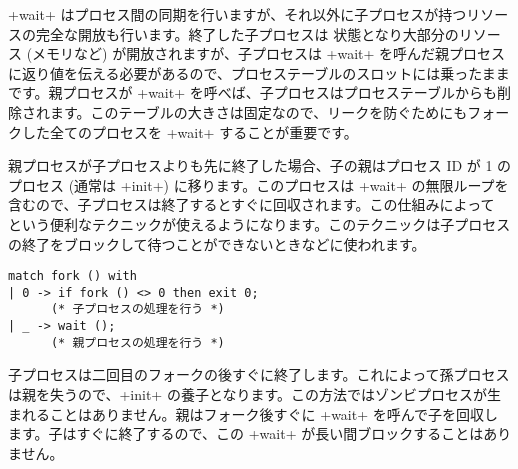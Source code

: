 \ml+wait+ はプロセス間の同期を行いますが、それ以外に子プロセスが持つリソースの完全な開放も行います。終了した子プロセスは  状態となり大部分のリソース (メモリなど) が開放されますが、子プロセスは \ml+wait+ を呼んだ親プロセスに返り値を伝える必要があるので、プロセステーブルのスロットには乗ったままです。親プロセスが \ml+wait+ を呼べば、子プロセスはプロセステーブルからも削除されます。このテーブルの大きさは固定なので、リークを防ぐためにもフォークした全てのプロセスを \ml+wait+ することが重要です。

\label{double-fork}
親プロセスが子プロセスよりも先に終了した場合、子の親はプロセス ID が 1 のプロセス (通常は \ml+init+) に移ります。このプロセスは \ml+wait+ の無限ループを含むので、子プロセスは終了するとすぐに回収されます。この仕組みによって  という便利なテクニックが使えるようになります。このテクニックは子プロセスの終了をブロックして待つことができないときなどに使われます。
%
\begin{lstlisting}
match fork () with
| 0 -> if fork () <> 0 then exit 0;
      (* 子プロセスの処理を行う *)
| _ -> wait ();
      (* 親プロセスの処理を行う *)
\end{lstlisting}
%
子プロセスは二回目のフォークの後すぐに終了します。これによって孫プロセスは親を失うので、\ml+init+ の養子となります。この方法ではゾンビプロセスが生まれることはありません。親はフォーク後すぐに \ml+wait+ を呼んで子を回収します。子はすぐに終了するので、この \ml+wait+ が長い間ブロックすることはありません。

